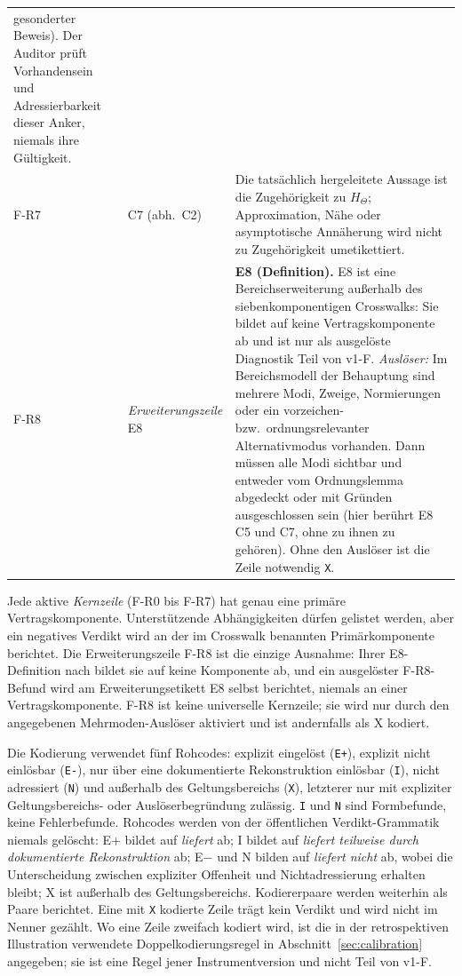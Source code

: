 \documentclass[11pt,a4paper]{article}
\begin{document}
\begin{table}[htbp]
\begin{tabularx}{\textwidth}{@{}l l >{\raggedright\arraybackslash}X@{}}
    gesonderter Beweis). Der Auditor prüft Vorhandensein und
    Adressierbarkeit dieser Anker, niemals ihre Gültigkeit. \\
F-R7 & C7 (abh.\ C2)
  & Die tatsächlich hergeleitete Aussage ist die Zugehörigkeit zu
    $H_\Theta$; Approximation, Nähe oder asymptotische Annäherung wird nicht
    zu Zugehörigkeit umetikettiert. \\
\midrule
F-R8 & \emph{Erweiterungszeile} E8
  & \textbf{E8 (Definition).} E8 ist eine Bereichserweiterung außerhalb des
    siebenkomponentigen Crosswalks: Sie bildet auf keine Vertragskomponente
    ab und ist nur als ausgelöste Diagnostik Teil von v1-F.
    \emph{Auslöser:} Im Bereichsmodell der Behauptung sind mehrere Modi,
    Zweige, Normierungen oder ein vorzeichen- bzw.\ ordnungsrelevanter
    Alternativmodus vorhanden. Dann müssen alle Modi sichtbar und entweder
    vom Ordnungslemma abgedeckt oder mit Gründen ausgeschlossen sein (hier
    berührt E8 C5 und C7, ohne zu ihnen zu gehören). Ohne den Auslöser ist
    die Zeile notwendig \texttt{X}. \\
\bottomrule
\end{tabularx}
\end{table}

Jede aktive \emph{Kernzeile} (F-R0 bis F-R7) hat genau eine primäre
Vertragskomponente. Unterstützende Abhängigkeiten dürfen gelistet werden,
aber ein negatives Verdikt wird an der im Crosswalk benannten
Primärkomponente berichtet. Die Erweiterungszeile F-R8 ist die einzige
Ausnahme: Ihrer E8-Definition nach bildet sie auf keine Komponente ab, und
ein ausgelöster F-R8-Befund wird am Erweiterungsetikett E8 selbst berichtet,
niemals an einer Vertragskomponente. F-R8 ist keine universelle Kernzeile;
sie wird nur durch den angegebenen Mehrmoden-Auslöser aktiviert und ist
andernfalls als X kodiert.

Die Kodierung verwendet fünf Rohcodes: explizit eingelöst (\texttt{E+}),
explizit nicht einlösbar (\texttt{E-}), nur über eine dokumentierte
Rekonstruktion einlösbar (\texttt{I}), nicht adressiert (\texttt{N}) und
außerhalb des Geltungsbereichs (\texttt{X}), letzterer nur mit expliziter
Geltungsbereichs- oder Auslöserbegründung zulässig. \texttt{I} und \texttt{N}
sind Formbefunde, keine Fehlerbefunde. Rohcodes werden von der öffentlichen
Verdikt-Grammatik niemals gelöscht: E+ bildet auf \emph{liefert} ab; I bildet
auf \emph{liefert teilweise durch dokumentierte Rekonstruktion} ab; E$-$ und
N bilden auf \emph{liefert nicht} ab, wobei die Unterscheidung zwischen
expliziter Offenheit und Nichtadressierung erhalten bleibt; X ist außerhalb
des Geltungsbereichs. Kodiererpaare werden weiterhin als Paare berichtet.
Eine mit \texttt{X} kodierte Zeile trägt kein Verdikt und wird nicht im
Nenner gezählt. Wo eine Zeile zweifach kodiert wird, ist die in der
retrospektiven Illustration verwendete Doppelkodierungsregel in
Abschnitt~\ref{sec:calibration} angegeben; sie ist eine Regel jener
Instrumentversion und nicht Teil von v1-F.
\end{document}
